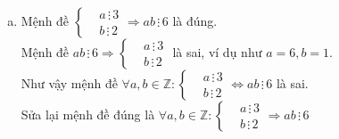 \begin{bt}
{\begin{enumerate}[a)]
			Sửa lại mệnh đề đúng là $\forall a,b,c\in \mathbb{R}: \left\{\begin{aligned}
			&a>b\\
			&b>c
			\end{aligned}\right.\Rightarrow a>c$.
			\item Mệnh đề $\left\{\begin{aligned}
			&a\,\vdots\, 3\\
			&b\,\vdots\, 2
			\end{aligned}\right.\Rightarrow ab\,\vdots\, 6$ là đúng.\\
			Mệnh đề $ab\,\vdots\, 6\Rightarrow \left\{\begin{aligned}
			&a\,\vdots\, 3\\
			&b\,\vdots\, 2
			\end{aligned}\right.$ là sai, ví dụ như $a=6, b=1$.\\
			Như vậy mệnh đề $\forall a,b \in \mathbb{Z}: \left\{\begin{aligned}
			&a\,\vdots\, 3\\
			&b\,\vdots\, 2
			\end{aligned}\right.\Leftrightarrow ab\,\vdots\, 6$ là sai.\\
			Sửa lại mệnh đề đúng là $\forall a,b \in \mathbb{Z}: \left\{\begin{aligned}
			&a\,\vdots\, 3\\
			&b\,\vdots\, 2
			\end{aligned}\right.\Rightarrow ab\,\vdots\, 6$
	\end{enumerate}}
\end{bt}
